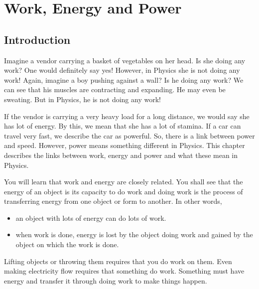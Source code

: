 \chapter{Work, Energy and Power}
\label{p:m:wpe12}


\section{Introduction}
Imagine a vendor carrying a basket of vegetables on her head. Is she doing any work? One would definitely say yes! However, in Physics she is not doing any work! Again, imagine a boy pushing against a wall? Is he doing any work? We can see that his muscles are contracting and expanding. He may even be sweating. But in Physics, he is not doing any work!

If the vendor is carrying a very heavy load for a long distance, we would say she has lot of energy. By this, we mean that she has a lot of stamina. If a car can travel very fast, we describe the car as powerful. So, there is a link between power and speed. However, power means something different in Physics. This chapter describes the links between work, energy and power and what these mean in Physics.

You will learn that work and energy are closely related. You shall see that the energy of an object is its capacity to do work and doing work is the process of transferring energy from one object or form to another. In other
words,

\begin{itemize}
\item{an object with lots of energy can do lots of work.}
\item{when work is done, energy is lost by the object doing work and gained by the object on which the work is done.}
\end{itemize}

Lifting objects or throwing them requires that you do work on them. Even making electricity flow requires that something do work. Something must have energy and transfer it through doing work to make things happen.

